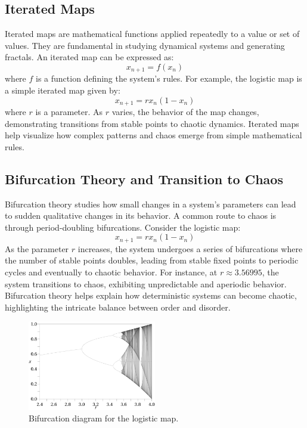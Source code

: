 \documentclass[12pt]{article}
\begin{document}
\subsection{Iterated Maps}
Iterated maps are mathematical functions applied repeatedly to a value or set of values. They are fundamental in studying dynamical systems and generating fractals. An iterated map can be expressed as:
\[
x_{n+1} = f(x_n)
\]
where \( f \) is a function defining the system's rules. For example, the logistic map is a simple iterated map given by:
\[
x_{n+1} = r x_n (1 - x_n)
\]
where \( r \) is a parameter. As \( r \) varies, the behavior of the map changes, demonstrating transitions from stable points to chaotic dynamics. Iterated maps help visualize how complex patterns and chaos emerge from simple mathematical rules.

\subsection{Bifurcation Theory and Transition to Chaos}
Bifurcation theory studies how small changes in a system's parameters can lead to sudden qualitative changes in its behavior. A common route to chaos is through period-doubling bifurcations. Consider the logistic map:
\[
x_{n+1} = r x_n (1 - x_n)
\]
As the parameter \( r \) increases, the system undergoes a series of bifurcations where the number of stable points doubles, leading from stable fixed points to periodic cycles and eventually to chaotic behavior. For instance, at \( r \approx 3.56995 \), the system transitions to chaos, exhibiting unpredictable and aperiodic behavior. Bifurcation theory helps explain how deterministic systems can become chaotic, highlighting the intricate balance between order and disorder.

\begin{figure}[H]
\centering
\includegraphics[width=0.5\textwidth]{assets/bifurcation.png}
\caption{Bifurcation diagram for the logistic map.}
\label{fig:bifurcation}
\end{figure}
\end{document}
